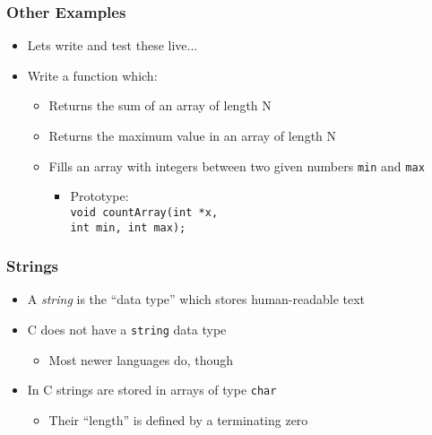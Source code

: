 \documentclass[14pt]{beamer}
\begin{document}
\begin{frame}
\frametitle{Other Examples}
\begin{itemize}
\item Lets write and test these live...
\item Write a function which:
	\begin{itemize}	
		\item Returns the sum of an array of length N
		\item Returns the maximum value in an array of length N
		\item Fills an array with integers between two given numbers \texttt{min} and \texttt{max}
			\begin{itemize}
				\item Prototype:\\\texttt{void countArray(int *x,\\\quad \quad \quad \quad int min, int max);}
			\end{itemize}
	\end{itemize}
\end{itemize}
\end{frame}

\begin{frame}
\frametitle{Strings}
\begin{itemize}
\item A \textit{string} is the ``data type'' which stores human-readable text
\item C does not have a \texttt{string} data type
	\begin{itemize}
		\item Most newer languages do, though
	\end{itemize}
\item In C strings are stored in arrays of type \texttt{char}
	\begin{itemize}
		\item Their ``length'' is defined by a terminating zero
	\end{itemize}
\end{itemize}
\end{frame}
\end{document}
